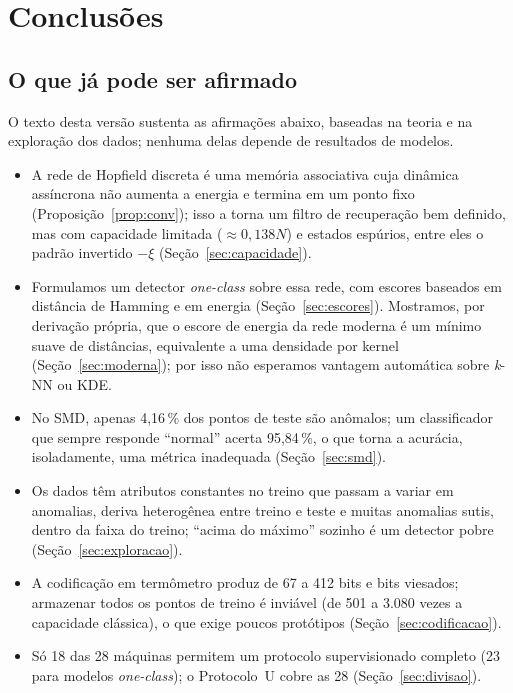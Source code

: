 \section{Conclusões}\label{sec:conclusoes}

\subsection{O que já pode ser afirmado}
O texto desta versão sustenta as afirmações abaixo, baseadas na teoria e na exploração dos dados; nenhuma delas
depende de resultados de modelos.
\begin{itemize}
  \item A rede de Hopfield discreta é uma memória associativa cuja dinâmica assíncrona não aumenta a energia e
        termina em um ponto fixo (Proposição~\ref{prop:conv}); isso a torna um filtro de recuperação bem
        definido, mas com capacidade limitada (${\approx}0{,}138N$) e estados espúrios, entre eles o padrão
        invertido $-\xi$ (Seção~\ref{sec:capacidade}).
  \item Formulamos um detector \emph{one-class} sobre essa rede, com escores baseados em distância de Hamming e
        em energia (Seção~\ref{sec:escores}). Mostramos, por derivação própria, que o escore de energia da rede
        moderna é um mínimo suave de distâncias, equivalente a uma densidade por kernel
        (Seção~\ref{sec:moderna}); por isso não esperamos vantagem automática sobre \emph{k}-NN ou KDE.
  \item No SMD, apenas 4,16\,\% dos pontos de teste são anômalos; um classificador que sempre responde
        ``normal'' acerta 95,84\,\%, o que torna a acurácia, isoladamente, uma métrica inadequada
        (Seção~\ref{sec:smd}).
  \item Os dados têm atributos constantes no treino que passam a variar em anomalias, deriva heterogênea entre
        treino e teste e muitas anomalias sutis, dentro da faixa do treino; ``acima do máximo'' sozinho é um
        detector pobre (Seção~\ref{sec:exploracao}).
  \item A codificação em termômetro produz de 67 a 412 bits e bits viesados; armazenar todos os pontos de
        treino é inviável (de 501 a 3.080 vezes a capacidade clássica), o que exige poucos protótipos
        (Seção~\ref{sec:codificacao}).
  \item Só 18 das 28 máquinas permitem um protocolo supervisionado completo (23 para modelos \emph{one-class});
        o Protocolo~U cobre as 28 (Seção~\ref{sec:divisao}).
\end{itemize}

